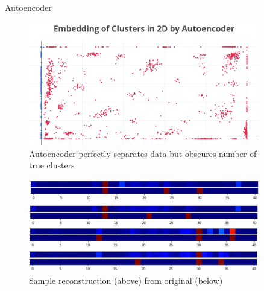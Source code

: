 \documentclass[final]{beamer}
\newlength{\sepwid}
\newlength{\onecolwid}
\begin{document}
\begin{frame}[t]
\begin{columns}[t]
\begin{column}{\onecolwid}
\begin{block}{Autoencoder}
\begin{figure}[!ht]
    \centering
    \includegraphics[width=.9\linewidth]{images/ae_embed.png}
    \caption{Autoencoder perfectly separates data but obscures number of true clusters}
\end{figure}

\begin{figure}[!ht]
    \centering
    \includegraphics[width=.9\linewidth]{images/reconstruct.PNG}
    \caption{Sample reconstruction (above) from original (below)}
\end{figure}
\end{block}



\end{column} %


\begin{column}{\sepwid}\end{column} %

\begin{column}{\onecolwid} %



\end{column}
\end{columns}
\end{frame}
\end{document}
